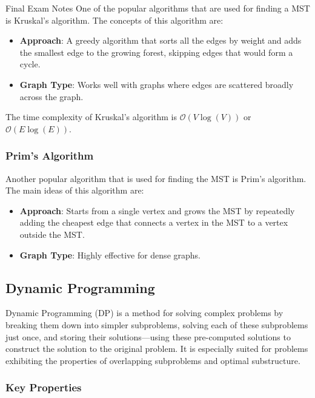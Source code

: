 \begin{examnotes}{Final Exam Notes}
    One of the popular algorithms that are used for finding a MST is Kruskal's algorithm. The concepts of this algorithm are:

    \begin{itemize}
        \item \textbf{Approach}: A greedy algorithm that sorts all the edges by weight and adds the smallest edge to the growing forest, skipping edges that would form a cycle.
        \item \textbf{Graph Type}: Works well with graphs where edges are scattered broadly across the graph.
    \end{itemize}
    The time complexity of Kruskal's algorithm is $\mathcal{O}(V \log{(V)})$ or $\mathcal{O}(E \log{(E)})$.

    \subsubsection*{Prim's Algorithm}

    Another popular algorithm that is used for finding the MST is Prim's algorithm. The main ideas of this algorithm are:

    \begin{itemize}
        \item \textbf{Approach}: Starts from a single vertex and grows the MST by repeatedly adding the cheapest edge that connects a vertex in the MST to a vertex outside the MST.
        \item \textbf{Graph Type}: Highly effective for dense graphs.
    \end{itemize}

    \subsection*{Dynamic Programming}

    Dynamic Programming (DP) is a method for solving complex problems by breaking them down into simpler subproblems, solving each of these subproblems just once, and storing their solutions—using 
    these pre-computed solutions to construct the solution to the original problem. It is especially suited for problems exhibiting the properties of overlapping subproblems and optimal substructure.

    \subsubsection*{Key Properties}


\end{examnotes}
